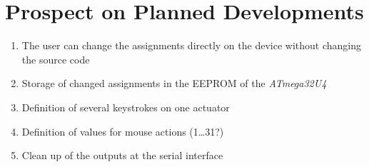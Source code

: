 \section{Prospect on Planned Developments}
\begin{enumerate}
\item The user can change the assignments directly on the device without
      changing the source code 
\item Storage of changed assignments in the EEPROM of the
      \textit{ATmega32U4}
\item Definition of several keystrokes on one actuator
\item Definition of values for mouse actions (1\dots31?)
\item Clean up of the outputs at the serial interface
\end{enumerate}
